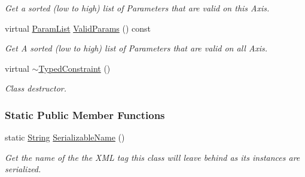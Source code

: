 \begin{DoxyCompactItemize}
\begin{DoxyCompactList}\small\item\em Get a sorted (low to high) list of Parameters that are valid on this Axis. \item\end{DoxyCompactList}\item 
virtual \hyperlink{classphys_1_1TypedConstraint_a4c2dcea3fbb764e454840329126d034e}{ParamList} \hyperlink{classphys_1_1TypedConstraint_ad061a210a8d870bd9be0ff01a5509549}{ValidParams} () const 
\begin{DoxyCompactList}\small\item\em Get A sorted (low to high) list of Parameters that are valid on all Axis. \item\end{DoxyCompactList}\item 
virtual \hyperlink{classphys_1_1TypedConstraint_a7489628bcfb15e712c09dbdcf6b20bff}{$\sim$TypedConstraint} ()
\begin{DoxyCompactList}\small\item\em Class destructor. \item\end{DoxyCompactList}\end{DoxyCompactItemize}
\subsubsection*{Static Public Member Functions}
\begin{DoxyCompactItemize}
\item 
static \hyperlink{namespacephys_aa03900411993de7fbfec4789bc1d392e}{String} \hyperlink{classphys_1_1TypedConstraint_adf4ccf2fcfc20634acde9d07508ff03e}{SerializableName} ()
\begin{DoxyCompactList}\small\item\em Get the name of the the XML tag this class will leave behind as its instances are serialized. \item\end{DoxyCompactList}\end{DoxyCompactItemize}
